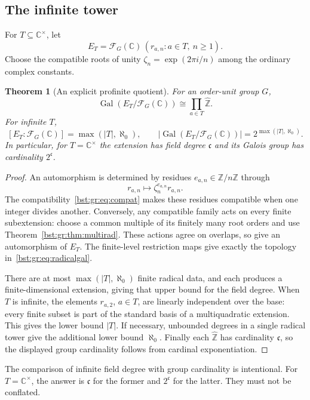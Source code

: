 \documentclass[11pt,letterpaper]{article}
\newtheorem{theorem}{Theorem}[section]
\theoremstyle{definition}
\theoremstyle{remark}
\newcommand{\C}{\mathbb C}
\newcommand{\Z}{\mathbb Z}
\newcommand{\FF}[2]{\mathcal F_{#2}(#1)}
\newcommand{\cc}{\mathfrak c}
\newcommand{\abs}[1]{\lvert #1\rvert}
\newcommand{\Gal}{\operatorname{Gal}}
\newcommand{\Zh}{\widehat{\Z}}
\begin{document}
\subsection{The infinite tower}

For $T\subseteq\C^\times$, let
\begin{equation}\label{bst:gr:eq:ET}
 E_T=\FF{\C}G\,(r_{a,n}:a\in T,\ n\geq1).
\end{equation}
Choose the compatible roots of unity $\zeta_n=\exp(2\pi i/n)$ among the
ordinary complex constants.

\begin{theorem}[An explicit profinite quotient]\label{bst:gr:thm:radicaltower}
For an order-unit group $G$,
\begin{equation}\label{bst:gr:eq:radicalgal}
 \Gal(E_T/\FF{\C}G)\cong\prod_{a\in T}\Zh.
\end{equation}
For infinite $T$,
\[
 [E_T:\FF{\C}G]=\max(\abs T,\aleph_0),
 \qquad
 \abs{\Gal(E_T/\FF{\C}G)}=2^{\max(\abs T,\aleph_0)}.
\]
In particular, for $T=\C^\times$ the extension has field degree $\cc$ and its
Galois group has cardinality $2^{\cc}$.
\end{theorem}
\begin{proof}
An automorphism is determined by residues $e_{a,n}\in\Z/n\Z$ through
\[
 r_{a,n}\longmapsto\zeta_n^{e_{a,n}}r_{a,n}.
\]
The compatibility~\eqref{bst:gr:eq:compat} makes these residues compatible
when one integer divides another. Conversely, any compatible family acts on
every finite subextension: choose a common multiple of its finitely many root
orders and use Theorem~\ref{bst:gr:thm:multirad}. These actions agree on
overlaps, so give an automorphism of $E_T$. The finite-level restriction maps
give exactly the topology in~\eqref{bst:gr:eq:radicalgal}.

There are at most $\max(\abs T,\aleph_0)$ finite radical data, and each
produces a finite-dimensional extension, giving that upper bound for the
field degree. When $T$ is infinite, the elements $r_{a,2}$, $a\in T$, are
linearly independent over the base: every finite subset is part of the
standard basis of a multiquadratic extension. This gives the lower bound
$\abs T$. If necessary, unbounded degrees in a single radical tower give the
additional lower bound $\aleph_0$. Finally each $\Zh$ has cardinality $\cc$,
so the displayed group cardinality follows from cardinal exponentiation.
\end{proof}

The comparison of infinite field degree with group cardinality is
intentional. For $T=\C^\times$, the answer is $\cc$ for the former and
$2^{\cc}$ for the latter. They must not be conflated.
\end{document}
